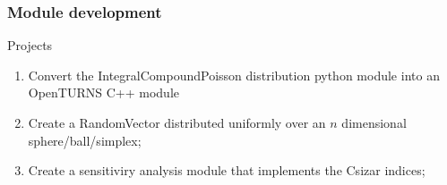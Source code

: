 \documentclass[8pt]{beamer}
\begin{document}
\begin{frame}
  \frametitle{Module development}
  \begin{block}{Projects}
    \begin{enumerate}
      \item Convert the IntegralCompoundPoisson distribution python module into an OpenTURNS C++ module
      \item Create a RandomVector distributed uniformly over an $n$ dimensional sphere/ball/simplex;
      \item Create a sensitiviry analysis module that implements the Csizar indices;
    \end{enumerate}
  \end{block}
\end{frame}
\end{document}
